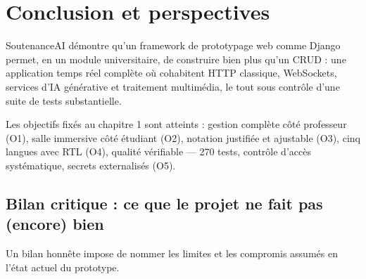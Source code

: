 \documentclass[12pt,a4paper]{report}
\begin{document}
\chapter*{Conclusion et perspectives}

SoutenanceAI démontre qu'un framework de prototypage web comme Django permet,
en un module universitaire, de construire bien plus qu'un CRUD : une
application temps réel complète où cohabitent HTTP classique, WebSockets,
services d'IA générative et traitement multimédia, le tout sous contrôle
d'une suite de tests substantielle.

Les objectifs fixés au chapitre 1 sont atteints : gestion complète côté
professeur (O1), salle immersive côté étudiant (O2), notation justifiée et
ajustable (O3), cinq langues avec RTL (O4), qualité vérifiable --- 270 tests,
contrôle d'accès systématique, secrets externalisés (O5).

\section*{Bilan critique : ce que le projet ne fait pas (encore) bien}

Un bilan honnête impose de nommer les limites et les compromis assumés en
l'état actuel du prototype.
\end{document}
